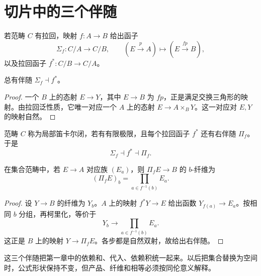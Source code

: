\section{切片中的三个伴随}
\begin{definition}[复合与基变换]
若范畴 $C$ 有拉回，映射 $f:A\to B$ 给出函子
\[
\Sigma_f:C/A\to C/B,
\qquad (E\xrightarrow pA)\mapsto(E\xrightarrow{fp}B),
\]
以及拉回函子 $f^*:C/B\to C/A$。
\end{definition}
\begin{proposition}
总有伴随 $\Sigma_f\dashv f^*$。
\end{proposition}
\begin{proof}
一个 $B$ 上的态射 $E\to Y$，其中 $E\to B$ 为 $fp$，正是满足交换三角形的映射。由拉回泛性质，它唯一对应一个 $A$ 上的态射 $E\to A\times_BY$。这一对应对 $E,Y$ 的映射自然。
\end{proof}
\begin{definition}[局部笛卡尔闭性]
范畴 $C$ 称为局部笛卡尔闭，若有有限极限，且每个拉回函子 $f^*$ 还有右伴随 $\Pi_f$。于是
\[
\Sigma_f\dashv f^*\dashv\Pi_f.
\]
\end{definition}
\begin{proposition}[集合中的依赖积右伴随]
在集合范畴中，若 $E\to A$ 对应族 $(E_a)$，则 $\Pi_fE\to B$ 的 $b$-纤维为
\[
(\Pi_fE)_b=\prod_{a\in f^{-1}(b)}E_a.
\]
\end{proposition}
\begin{proof}
设 $Y\to B$ 的纤维为 $Y_b$。$A$ 上的映射 $f^*Y\to E$ 给出函数 $Y_{f(a)}\to E_a$。按相同 $b$ 分组，再柯里化，等价于
\[
Y_b\to\prod_{a\in f^{-1}(b)}E_a.
\]
这正是 $B$ 上的映射 $Y\to\Pi_fE$。各步都是自然双射，故给出右伴随。
\end{proof}
\begin{remark}
这三个伴随把第一章中的依赖和、代入、依赖积统一起来。以后把集合替换为空间时，公式形状保持不变，但产品、纤维和相等必须按同伦意义解释。
\end{remark}
